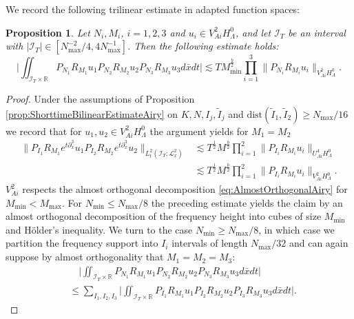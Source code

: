 \documentclass{amsart}
\newtheorem{proposition}[theorem]{Proposition}
\theoremstyle{definition}
\newcommand{\R}{\mathbb{R}}
\begin{document}
We record the following trilinear estimate in adapted function spaces:
\begin{proposition}
\label{prop:TrilinearEstimate}
Let $N_i, M_i$, $i=1,2,3$ and $u_i \in V^2_{Ai} H^0_{\Lambda}$, and let $\mathcal{I}_T$ be an interval with $|\mathcal{I}_T| \in [ N_{\max}^{-2}/4,4N_{\max}^{-1}]$. Then the following estimate holds:
\begin{equation*}
\big| \iint_{\mathcal{I}_T \times \R} P_{N_1} R_{M_1} u_1 P_{N_2} R_{M_2} u_2 P_{N_3} R_{M_3} u_3 d\bar{x} dt \big| \lesssim T M_{\min}^{\frac{b}{2}} \prod_{i=1}^3 \| P_{N_i} R_{M_i} u_i \|_{V^2_{Ai} H^0_\Lambda}.
\end{equation*}
\end{proposition}
\begin{proof}
Under the assumptions of Proposition \ref{prop:ShorttimeBilinearEstimateAiry} on $K,N,I_j,\tilde{I}_j$ and $\text{dist}(\tilde{I}_1,\tilde{I}_2) \geq N_{\max}/16$ we record that for $u_1,u_2 \in V^2_{Ai} H^0_\Lambda$ the argument yields for $M_1 = M_2$
\begin{equation*}
\begin{split}
\| P_{I_1} R_{M_1} e^{t \partial_x^3} u_1 P_{I_2} R_{M_2} e^{t \partial_x^3} u_2 \|_{L^2_t( \mathcal{I}_T; \mathcal{L}^2_x)} &\lesssim T^{\frac{1}{2}} M^{\frac{b}{2}} \prod_{i=1}^2 \| P_{I_i} R_{M_i} u_i \|_{U^4_{Ai} H^0_\Lambda} \\
&\lesssim T^{\frac{1}{2}} M^{\frac{b}{2}} \prod_{i=1}^2 \| P_{I_i} R_{M_i} u_i \|_{V^2_{Ai} H^0_\Lambda}.
\end{split}
\end{equation*}
$V^2_{Ai}$ respects the almost orthogonal decomposition \eqref{eq:AlmostOrthogonalAiry} for $M_{\min} < M_{\max}$.
For $N_{\min} \leq N_{\max}/8$ the preceding estimate yields the claim by an almost orthogonal decomposition of the frequency height into cubes of size $M_{\min}$ and H\"older's inequality.
We turn to the case $N_{\min} \geq N_{\max}/8$, in which case we partition the frequency support into $I_i$ intervals of length $N_{\max}/32$ and can again suppose by almost orthogonality that $M_1=M_2=M_3$:
\begin{equation*}
\begin{split}
&\quad \big| \iint_{\mathcal{I}_T \times \R} P_{N_1} R_{M_1} u_1 P_{N_2} R_{M_2} u_2 P_{N_3} R_{M_3} u_3 d\bar{x} dt \big| \\
 &\leq \sum_{I_1,I_2,I_3} \big| \iint_{\mathcal{I}_T \times \R} P_{I_1} R_{M_1} u_1 P_{I_2} R_{M_2} u_2 P_{I_3} R_{M_3} u_3 d\bar{x} dt \big|.
\end{split}

\end{equation*}
\end{proof}
\end{document}
